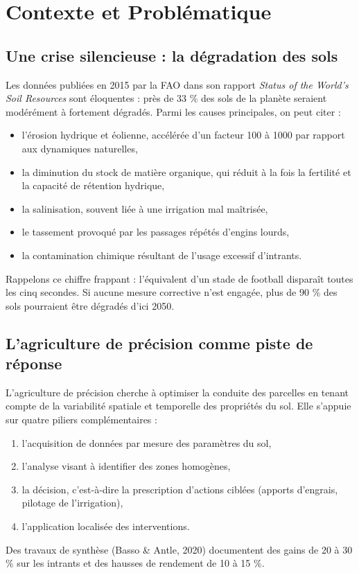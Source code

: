 \documentclass[a4paper,12pt,openany,titlepage]{scrartcl}
\begin{document}
\newpage

\section{Contexte et Probl\'ematique}

\subsection{Une crise silencieuse : la dégradation des sols}

Les données publiées en 2015 par la FAO dans son rapport \textit{Status of the World's Soil Resources} sont éloquentes : près de 33 \% des sols de la planète seraient modérément à fortement dégradés. Parmi les causes principales, on peut citer :
\begin{itemize}[nosep]
    \item l’érosion hydrique et éolienne, accélérée d’un facteur 100 à 1000 par rapport aux dynamiques naturelles,
    \item la diminution du stock de matière organique, qui réduit à la fois la fertilité et la capacité de rétention hydrique,
    \item la salinisation, souvent liée à une irrigation mal maîtrisée,
    \item le tassement provoqué par les passages répétés d’engins lourds,
    \item la contamination chimique résultant de l’usage excessif d’intrants.
\end{itemize}

Rappelons ce chiffre frappant : l’équivalent d’un stade de football disparaît toutes les cinq secondes. Si aucune mesure corrective n’est engagée, plus de 90 \% des sols pourraient être dégradés d’ici 2050.

\subsection{L’agriculture de précision comme piste de réponse}

L’agriculture de précision cherche à optimiser la conduite des parcelles en tenant compte de la variabilité spatiale et temporelle des propriétés du sol. Elle s’appuie sur quatre piliers complémentaires :
\begin{enumerate}[nosep]
    \item l’acquisition de données par mesure des paramètres du sol,
    \item l’analyse visant à identifier des zones homogènes,
    \item la décision, c’est-à-dire la prescription d’actions ciblées (apports d’engrais, pilotage de l’irrigation),
    \item l’application localisée des interventions.
\end{enumerate}
Des travaux de synthèse (Basso \& Antle, 2020) documentent des gains de 20 à 30 \% sur les intrants et des hausses de rendement de 10 à 15 \%.
\end{document}
